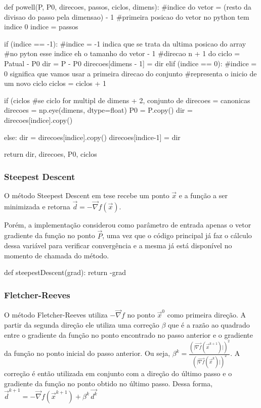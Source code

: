 \documentclass[10pt, a4paper]{article}
\begin{document}
\begin{python}
  def powell(P, P0, direcoes, passos, ciclos, dimens):
    #indice do vetor = (resto da divisao do passo pela dimensao) - 1
    #primeira posicao do vetor no python tem indice 0
    indice = passos%
    
    if (indice == -1):
        #indice = -1 indica que se trata da ultima posicao do array
        #no pyton esse indice eh o tamanho do vetor - 1
        #direcao n + 1 do ciclo = Patual - P0
        dir = P - P0
        direcoes[dimens - 1] = dir        
    elif (indice == 0):
        #indice = 0 significa que vamos usar a primeira direcao do conjunto
        #representa o inicio de um novo ciclo
        ciclos = ciclos + 1

        if (ciclos%
            #se ciclo for multipl de dimens + 2, conjunto de direcoes = canonicas
            direcoes = np.eye(dimens, dtype=float)
        P0 = P.copy()
        dir = direcoes[indice].copy()
        
    else:
        dir = direcoes[indice].copy()
        direcoes[indice-1] = dir
  
    return dir, direcoes, P0, ciclos 
\end{python}

\subsubsection{Steepest Descent}
O método Steepest Descent em tese recebe um ponto $\overrightarrow{x}$ e a função a ser minimizada e
retorna $\overrightarrow{d} = - \overrightarrow{\nabla} f(\overrightarrow{x})$.

Porém, a implementação considerou como parâmetro de entrada apenas o vetor gradiente da função no ponto $\overrightarrow{P}$,
uma vez que o código principal já faz o cálculo dessa variável para verificar convergência e
a mesma já está disponível no momento de chamada do método.

\begin{python}
 def steepestDescent(grad):
    return -grad
\end{python}

\subsubsection{Fletcher-Reeves}
O método Fletcher-Reeves utiliza $-\overrightarrow{\nabla}f$ no ponto $\overrightarrow{x}^0$ como primeira direção. A partir da segunda direção
ele utiliza uma correção $\beta$ que é a razão ao quadrado entre o gradiente da função no ponto encontrado no passo anterior e o gradiente da função no ponto
inicial do passo anterior. Ou seja, $\beta^k = \frac{(\lvert\overrightarrow{\nabla f}(\overrightarrow{x}^{k+1})\rvert)^2}{(\lvert\overrightarrow{\nabla f}(\overrightarrow{x}^k)\rvert)^2}$.
A correção é então utilizada em conjunto com a direção do último passo e o gradiente da função no ponto obtido no último passo. Dessa forma,
$\overrightarrow{d}^{k+1} = -\overrightarrow{\nabla}f(\overrightarrow{x}^{k+1}) + \beta^k\,\overrightarrow{d^k}$
\end{document}
